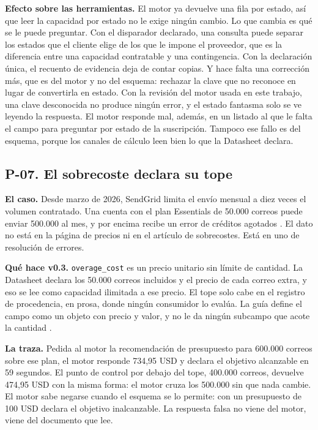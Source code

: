\textbf{Efecto sobre las herramientas.} El motor ya devuelve una fila por estado,
así que leer la capacidad por estado no le exige ningún cambio. Lo que cambia es
qué se le puede preguntar. Con el disparador declarado, una consulta puede separar
los estados que el cliente elige de los que le impone el proveedor, que es la
diferencia entre una capacidad contratable y una contingencia. Con la declaración
única, el recuento de evidencia deja de contar copias. Y hace falta una corrección
más, que es del motor y no del esquema: rechazar la clave que no reconoce en lugar
de convertirla en estado.
Con la revisión del motor usada en este trabajo, una clave desconocida no produce ningún error, y el estado fantasma solo se ve leyendo la respuesta.
El motor responde mal, además, en un listado al que le falta el campo para preguntar por estado de la suscripción.
Tampoco ese fallo es del esquema, porque los canales de cálculo leen bien lo que la Datasheet declara.

\subsection{P-07. El sobrecoste declara su tope}
\label{subsec:evolucion:p07}

\textbf{El caso.} Desde marzo de 2026, SendGrid limita el envío mensual a diez veces
el volumen contratado. Una cuenta con el plan Essentials de 50.000
correos puede enviar 500.000 al mes, y por encima recibe un error de créditos
agotados \citep{sendgriddocs}. El dato no está en la página de precios ni en el
artículo de sobrecostes. Está en uno de resolución de errores.

\textbf{Qué hace v0.3.} \texttt{overage\_cost} es un precio unitario sin límite de
cantidad. La Datasheet declara los 50.000 correos incluidos y el precio de cada
correo extra, y eso se lee como capacidad ilimitada a ese precio. El tope solo
cabe en el registro de procedencia, en prosa, donde ningún consumidor lo evalúa. La
guía define el campo como un objeto con precio y valor, y no le da ningún subcampo
que acote la cantidad \citep{apisconsumptionmodel}.

\textbf{La traza.} Pedida al motor la recomendación de presupuesto para 600.000
correos sobre ese plan, el motor responde 734,95 USD y declara el objetivo
alcanzable en 59 segundos. El punto de control por debajo del tope, 400.000 correos, devuelve 474,95
USD con la misma forma: el motor cruza los 500.000 sin que nada cambie.
El motor sabe negarse cuando el esquema se lo permite: con un presupuesto de 100 USD
declara el objetivo inalcanzable. La respuesta falsa no viene del motor, viene del
documento que lee.

